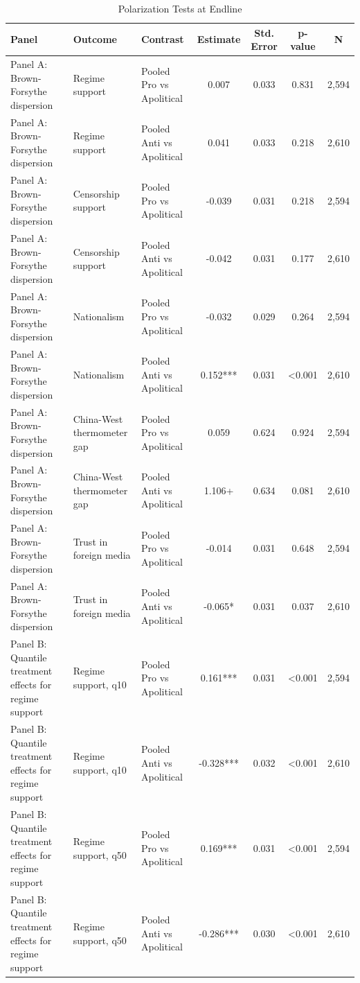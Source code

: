 \begin{table}[H]
\centering
\caption{Polarization Tests at Endline}
\label{tab:polarization_t1}
\footnotesize
\begin{threeparttable}
\begin{tabular}{lllcccc}
\toprule
Panel & Outcome & Contrast & Estimate & Std. Error & p-value & N \\
\midrule
Panel A: Brown-Forsythe dispersion & Regime support & Pooled Pro vs Apolitical & 0.007 & 0.033 & 0.831 & 2,594 \\
Panel A: Brown-Forsythe dispersion & Regime support & Pooled Anti vs Apolitical & 0.041 & 0.033 & 0.218 & 2,610 \\
Panel A: Brown-Forsythe dispersion & Censorship support & Pooled Pro vs Apolitical & -0.039 & 0.031 & 0.218 & 2,594 \\
Panel A: Brown-Forsythe dispersion & Censorship support & Pooled Anti vs Apolitical & -0.042 & 0.031 & 0.177 & 2,610 \\
Panel A: Brown-Forsythe dispersion & Nationalism & Pooled Pro vs Apolitical & -0.032 & 0.029 & 0.264 & 2,594 \\
Panel A: Brown-Forsythe dispersion & Nationalism & Pooled Anti vs Apolitical & 0.152*** & 0.031 & <0.001 & 2,610 \\
Panel A: Brown-Forsythe dispersion & China-West thermometer gap & Pooled Pro vs Apolitical & 0.059 & 0.624 & 0.924 & 2,594 \\
Panel A: Brown-Forsythe dispersion & China-West thermometer gap & Pooled Anti vs Apolitical & 1.106+ & 0.634 & 0.081 & 2,610 \\
Panel A: Brown-Forsythe dispersion & Trust in foreign media & Pooled Pro vs Apolitical & -0.014 & 0.031 & 0.648 & 2,594 \\
Panel A: Brown-Forsythe dispersion & Trust in foreign media & Pooled Anti vs Apolitical & -0.065* & 0.031 & 0.037 & 2,610 \\
Panel B: Quantile treatment effects for regime support & Regime support, q10 & Pooled Pro vs Apolitical & 0.161*** & 0.031 & <0.001 & 2,594 \\
Panel B: Quantile treatment effects for regime support & Regime support, q10 & Pooled Anti vs Apolitical & -0.328*** & 0.032 & <0.001 & 2,610 \\
Panel B: Quantile treatment effects for regime support & Regime support, q50 & Pooled Pro vs Apolitical & 0.169*** & 0.031 & <0.001 & 2,594 \\
Panel B: Quantile treatment effects for regime support & Regime support, q50 & Pooled Anti vs Apolitical & -0.286*** & 0.030 & <0.001 & 2,610 \\

\end{tabular}
\end{threeparttable}
\end{table}
